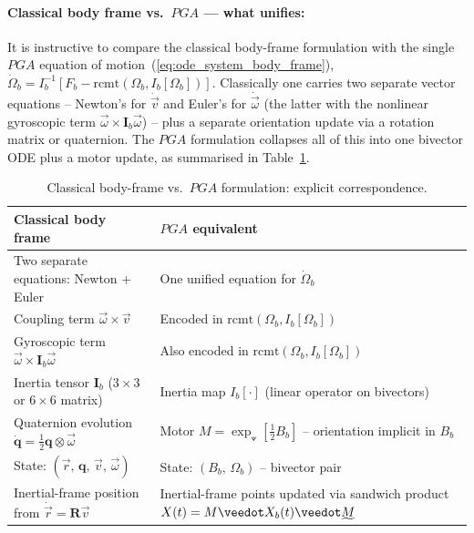 \paragraph{Classical body frame vs.\ $PGA$ --- what unifies:} It is instructive to compare
the classical body-frame formulation with the single $PGA$ equation of
motion~(\ref{eq:ode_system_body_frame}), $\dot{\Omega}_b = I_b^{-1}\!\left[F_b -
\mathrm{rcmt}(\Omega_b, I_b[\Omega_b])\right]$. Classically one carries two separate vector equations -- Newton's
for $\dot{\vec{v}}$ and Euler's for $\dot{\vec{\omega}}$ (the latter with the nonlinear
gyroscopic term $\vec{\omega}\times\mathbf{I}_b\vec{\omega}$) -- plus a separate
orientation update via a rotation matrix or quaternion. The $PGA$ formulation collapses
all of this into one bivector ODE plus a motor update, as summarised in
Table~\ref{tab:classical_vs_pga}. \\

\begin{table}[!ht]
\centering\small
\begin{tabular}{p{6.0cm}|p{6.5cm}}
\hline
Classical body frame &
$PGA$ equivalent \\
\hline
Two separate equations: Newton + Euler &
One unified equation for $\dot{\Omega}_b$ \\
Coupling term $\vec{\omega}\times\vec{v}$ &
Encoded in $\mathrm{rcmt}(\Omega_b, I_b[\Omega_b])$ \\
Gyroscopic term $\vec{\omega}\times\mathbf{I}_b\vec{\omega}$ &
Also encoded in $\mathrm{rcmt}(\Omega_b, I_b[\Omega_b])$ \\
Inertia tensor $\mathbf{I}_b$ ($3\times3$ or $6\times6$ matrix) &
Inertia map $I_b[\cdot]$ (linear operator on bivectors) \\
Quaternion evolution $\dot{\mathbf{q}} = \frac{1}{2}\mathbf{q}\otimes\vec{\omega}$ &
Motor $M = \exp_\veedot[\frac{1}{2} B_b]$ -- orientation implicit in $B_b$ \\
State: $(\vec{r},\, \mathbf{q},\, \vec{v},\, \vec{\omega})$ &
State: $(B_b,\, \Omega_b)$ -- bivector pair \\
Inertial-frame position from $\dot{\vec{r}} = \mathbf{R}\vec{v}$ &
Inertial-frame points updated via sandwich product
$X(t) = M \veedot X_b(t) \veedot \rrev{M}$ \\
\hline
\end{tabular}
\caption{Classical body-frame vs.\ $PGA$ formulation: explicit correspondence.}
\label{tab:classical_vs_pga}
\end{table}

